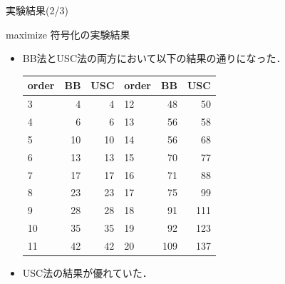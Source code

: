 \documentclass[dvipdfmx,11pt]{beamer}
\begin{document}
\begin{frame}{実験結果(2/3)}
 \begin{block}{maximize}
  符号化の実験結果
  \begin{itemize}
   \item BB法とUSC法の両方において以下の結果の通りになった．
         \begin{table}
          \begin{tabular}{l|r|r||l|r|r}
           \hline
           order & BB & USC & order & BB & USC \\
           \hline
           3  & \alert{4}   & \alert{4}    & 12 & 48         & \alert{50}  \\
           4  & \alert{6}   & \alert{6}    & 13 & 56         & \alert{58}  \\
           5  & \alert{10}  & \alert{10}   & 14 & 56         & \alert{68}  \\
           6  & \alert{13}  & \alert{13}   & 15 & 70         & \alert{77}  \\
           7  & \alert{17}  & \alert{17}   & 16 & 71         & \alert{88}  \\
           8  & \alert{23}  & \alert{23}   & 17 & 75         & \alert{99}  \\
           9  & 28          & \alert{28}   & 18 & 91         & \alert{111} \\
           10 & 35          & \alert{35}   & 19 & 92         & \alert{123} \\
           11 & 42          & \alert{42}   & 20 & 109        & \alert{137} \\
           \hline
          \end{tabular}
         \end{table}
   \item USC法の結果が優れていた．
  \end{itemize}
 \end{block}
\end{frame}

\end{document}
